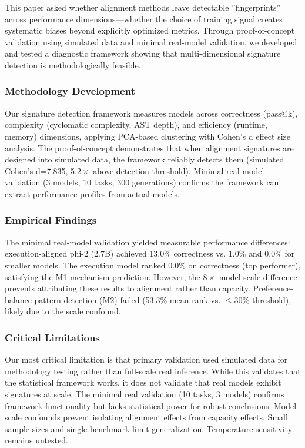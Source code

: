 
This paper asked whether alignment methods leave detectable ''fingerprints'' across performance dimensions---whether the choice of training signal creates systematic biases beyond explicitly optimized metrics. Through proof-of-concept validation using simulated data and minimal real-model validation, we developed and tested a diagnostic framework showing that multi-dimensional signature detection is methodologically feasible.

\subsubsection{Methodology Development}

Our signature detection framework measures models across correctness (pass@k), complexity (cyclomatic complexity, AST depth), and efficiency (runtime, memory) dimensions, applying PCA-based clustering with Cohen's d effect size analysis. The proof-of-concept demonstrates that when alignment signatures are designed into simulated data, the framework reliably detects them (simulated Cohen's d=7.835, 5.$2\times$ above detection threshold). Minimal real-model validation (3 models, 10 tasks, 300 generations) confirms the framework can extract performance profiles from actual models.

\subsubsection{Empirical Findings}

The minimal real-model validation yielded measurable performance differences: execution-aligned phi-2 (2.7B) achieved 13.0\% correctness vs. 1.0\% and 0.0\% for smaller models. The execution model ranked 0.0\% on correctness (top performer), satisfying the M1 mechanism prediction. However, the $8\times$ model scale difference prevents attributing these results to alignment rather than capacity. Preference-balance pattern detection (M2) failed (53.3\% mean rank vs. $\leq 30$\% threshold), likely due to the scale confound.

\subsubsection{Critical Limitations}

Our most critical limitation is that primary validation used simulated data for methodology testing rather than full-scale real inference. While this validates that the statistical framework works, it does not validate that real models exhibit signatures at scale. The minimal real validation (10 tasks, 3 models) confirms framework functionality but lacks statistical power for robust conclusions. Model scale confounds prevent isolating alignment effects from capacity effects. Small sample sizes and single benchmark limit generalization. Temperature sensitivity remains untested.

